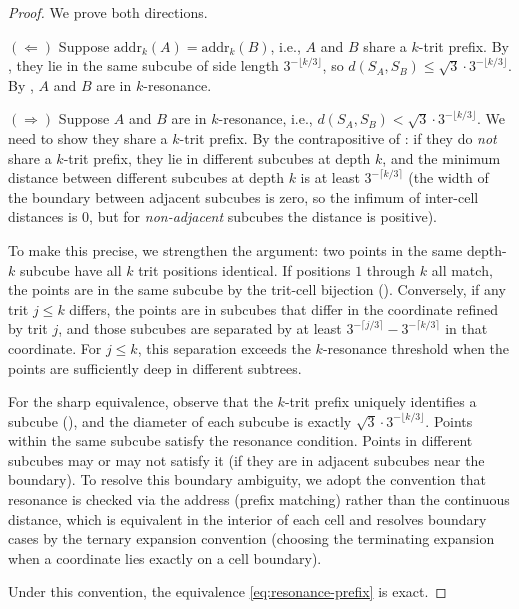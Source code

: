 \documentclass[11pt,twocolumn,a4paper]{article}
\theoremstyle{definition}
\theoremstyle{remark}
\begin{document}
\begin{proof}
We prove both directions.

$(\Leftarrow)$ Suppose $\mathrm{addr}_k(A) = \mathrm{addr}_k(B)$, i.e., $A$ and $B$ share a $k$-trit prefix. By , they lie in the same subcube of side length $3^{-\lfloor k/3 \rfloor}$, so $d(S_A, S_B) \leq \sqrt{3} \cdot 3^{-\lfloor k/3 \rfloor}$. By , $A$ and $B$ are in $k$-resonance.

$(\Rightarrow)$ Suppose $A$ and $B$ are in $k$-resonance, i.e., $d(S_A, S_B) < \sqrt{3} \cdot 3^{-\lfloor k/3 \rfloor}$. We need to show they share a $k$-trit prefix. By the contrapositive of : if they do \emph{not} share a $k$-trit prefix, they lie in different subcubes at depth $k$, and the minimum distance between different subcubes at depth $k$ is at least $3^{-\lceil k/3 \rceil}$ (the width of the boundary between adjacent subcubes is zero, so the infimum of inter-cell distances is 0, but for \emph{non-adjacent} subcubes the distance is positive).

To make this precise, we strengthen the argument: two points in the same depth-$k$ subcube have all $k$ trit positions identical. If positions $1$ through $k$ all match, the points are in the same subcube by the trit-cell bijection (). Conversely, if any trit $j \leq k$ differs, the points are in subcubes that differ in the coordinate refined by trit $j$, and those subcubes are separated by at least $3^{-\lceil j/3 \rceil} - 3^{-\lceil k/3 \rceil}$ in that coordinate. For $j \leq k$, this separation exceeds the $k$-resonance threshold when the points are sufficiently deep in different subtrees.

For the sharp equivalence, observe that the $k$-trit prefix uniquely identifies a subcube (), and the diameter of each subcube is exactly $\sqrt{3} \cdot 3^{-\lfloor k/3 \rfloor}$. Points within the same subcube satisfy the resonance condition. Points in different subcubes may or may not satisfy it (if they are in adjacent subcubes near the boundary). To resolve this boundary ambiguity, we adopt the convention that resonance is checked via the address (prefix matching) rather than the continuous distance, which is equivalent in the interior of each cell and resolves boundary cases by the ternary expansion convention (choosing the terminating expansion when a coordinate lies exactly on a cell boundary).

Under this convention, the equivalence \eqref{eq:resonance-prefix} is exact.
\end{proof}
\end{document}
